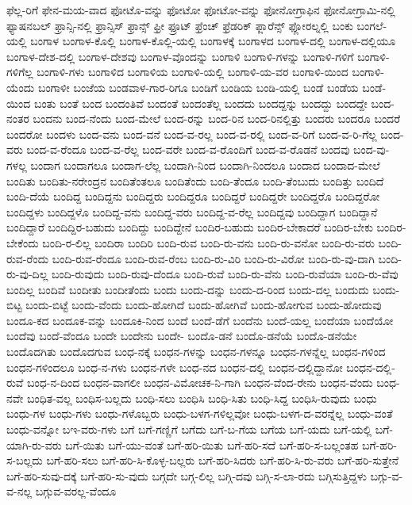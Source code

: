 {ಫೆಲ್ಲ-ರಿಗೆ
ಫೇನ-ಮಯ-ವಾದ
ಫೋಟೊ-ವನ್ನು
ಫೋಟೋ
ಫೋಟೋ-ವನ್ನು
ಫೋನೋಗ್ರಾಫಿನ
ಫೋನೋಗ್ರಾಮಿ-ನಲ್ಲಿ
ಫ್ಯಾಷನಬಲ್
ಫ್ರಾನ್ಸಿ-ನಲ್ಲಿ
ಫ್ರಾನ್ಸಿಸ್
ಫ್ರಾನ್ಸ್
ಫ್ರೀ
ಫ್ರೂಟ್
ಫ್ರೆಂಚ್
ಫ್ರೆಡರಿಕ್
ಫ್ಲಾರೆನ್ಸ್
ಫ್ಲೋರಲ್ನಲ್ಲಿ
ಬಂಕು
ಬಂಗಲೆ-ಯಲ್ಲಿ
ಬಂಗಾಳ
ಬಂಗಾಳ-ಕೊಲ್ಲಿ
ಬಂಗಾಳ-ಕೊಲ್ಲಿ-ಯಲ್ಲಿ
ಬಂಗಾಳಕ್ಕೆ
ಬಂಗಾಳದ
ಬಂಗಾಳ-ದಲ್ಲಿ
ಬಂಗಾಳ-ದಲ್ಲಿಯೂ
ಬಂಗಾಳ-ದೇಶ-ದಲ್ಲಿ
ಬಂಗಾಳ-ದೇಶವು
ಬಂಗಾಳ-ವೊಂದನ್ನು
ಬಂಗಾಳಿ
ಬಂಗಾಳಿ-ಗಳನ್ನು
ಬಂಗಾಳಿ-ಗಳಿಗೆ
ಬಂಗಾಳಿ-ಗಳಿಗೆಲ್ಲ
ಬಂಗಾಳಿ-ಗಳು
ಬಂಗಾಳಿದ
ಬಂಗಾಳಿಯ
ಬಂಗಾಳಿ-ಯಲ್ಲಿ
ಬಂಗಾಳಿ-ಯ-ವರ
ಬಂಗಾಳಿ-ಯಿಂದ
ಬಂಗಾಳಿ-ಯೆಂದು
ಬಂಗಾಳೀ
ಬಂಜೆಯ
ಬಂಡವಾಳ-ಗಾರ-ರಿಗೂ
ಬಂಡಿಗೆ
ಬಂಡಿಯ
ಬಂಡಿ-ಯಲ್ಲಿ
ಬಂಡೆ
ಬಂಡೆಯ
ಬಂಡೆ-ಯಿಂದ
ಬಂತು
ಬಂತೆ
ಬಂದ
ಬಂದಂತಿವೆ
ಬಂದಂತೆ
ಬಂದಂತೆಲ್ಲ
ಬಂದದು
ಬಂದದ್ದನ್ನು
ಬಂದದ್ದು
ಬಂದದ್ದೇ
ಬಂದ-ನಂತರ
ಬಂದನು
ಬಂದ-ನೆಂದು
ಬಂದ-ಮೇಲೆ
ಬಂದ-ರನ್ನು
ಬಂದ-ರಿನ
ಬಂದ-ರಿನಲ್ಲಿತ್ತು
ಬಂದರು
ಬಂದರೂ
ಬಂದರೆ
ಬಂದರೋ
ಬಂದಳು
ಬಂದ-ವನು
ಬಂದ-ವನೆ
ಬಂದ-ವ-ರಲ್ಲ
ಬಂದ-ವ-ರಲ್ಲಿ
ಬಂದ-ವ-ರಿಗೆ
ಬಂದ-ವ-ರಿ-ಗೆಲ್ಲ
ಬಂದ-ವರು
ಬಂದ-ವ-ರೆಂದೂ
ಬಂದ-ವ-ರೆಲ್ಲ
ಬಂದ-ವರೇ
ಬಂದ-ವ-ರೊಂದಿಗೆ
ಬಂದ-ವ-ರೊಡನೆ
ಬಂದವು
ಬಂದ-ವು-ಗಳಲ್ಲ
ಬಂದಾಗ
ಬಂದಾಗಲೂ
ಬಂದಾಗ-ಲೆಲ್ಲ
ಬಂದಾಗಿ-ನಿಂದ
ಬಂದಾಗಿ-ನಿಂದಲೂ
ಬಂದಾದ
ಬಂದಾದ-ಮೇಲೆ
ಬಂದಿತು
ಬಂದಿತು-ನರೇಂದ್ರನ
ಬಂದಿತೆಂತಲೂ
ಬಂದಿತೆಂದು
ಬಂದಿ-ತೆಂದೂ
ಬಂದಿ-ತೆಂಬುದು
ಬಂದಿತ್ತು
ಬಂದಿದೆ
ಬಂದಿ-ದೆಯೆ
ಬಂದಿದ್ದ
ಬಂದಿದ್ದನು
ಬಂದಿದ್ದರು
ಬಂದಿದ್ದರೂ
ಬಂದಿದ್ದರೆ
ಬಂದಿದ್ದರೇ
ಬಂದಿದ್ದರೊ
ಬಂದಿದ್ದರೋ
ಬಂದಿದ್ದಳು
ಬಂದಿದ್ದಳೊ
ಬಂದಿದ್ದ-ವನು
ಬಂದಿದ್ದ-ವರು
ಬಂದಿದ್ದ-ವ-ರೆಲ್ಲ
ಬಂದಿದ್ದವು
ಬಂದಿದ್ದಾಗ
ಬಂದಿದ್ದಾನೆ
ಬಂದಿದ್ದಾರೆ
ಬಂದಿದ್ದಿರ-ಬಹುದು
ಬಂದಿದ್ದು
ಬಂದಿದ್ದೇನೆ
ಬಂದಿರ-ಬಹುದು
ಬಂದಿರ-ಬೇಕಾದರೆ
ಬಂದಿರ-ಬೇಕು
ಬಂದಿರ-ಬೇಕೆಂದು
ಬಂದಿ-ರ-ಲಿಲ್ಲ
ಬಂದಿರಾ
ಬಂದಿರಿ
ಬಂದಿ-ರುವ
ಬಂದಿ-ರು-ವನು
ಬಂದಿ-ರು-ವನೋ
ಬಂದಿ-ರು-ವರು
ಬಂದಿ-ರುವ-ರೆಂದು
ಬಂದಿ-ರುವ-ರೆಂದೂ
ಬಂದಿ-ರುವ-ರೆಂಬ
ಬಂದಿ-ರು-ವಿರಿ
ಬಂದಿ-ರು-ವಿರೋ
ಬಂದಿ-ರು-ವು-ದಾಗಿ
ಬಂದಿ-ರು-ವು-ದಿಲ್ಲ
ಬಂದಿ-ರುವುದು
ಬಂದಿ-ರುವು-ದೆಂದೂ
ಬಂದಿ-ರುವೆ
ಬಂದಿ-ರು-ವೆನು
ಬಂದಿ-ರುವೆಯಾ
ಬಂದಿ-ರು-ವೆವು
ಬಂದಿಲ್ಲ
ಬಂದಿವೆ
ಬಂದೀತು
ಬಂದೀತೆಂದು
ಬಂದು
ಬಂದು-ದನ್ನು
ಬಂದು-ದ-ರಿಂದ
ಬಂದು-ದಲ್ಲ
ಬಂದುದು
ಬಂದು-ಬಿಟ್ಟ
ಬಂದು-ಬಿಟ್ಟೆ
ಬಂದು-ವೆಂದು
ಬಂದು-ಹೋಗಿದೆ
ಬಂದು-ಹೋಗಿವೆ
ಬಂದು-ಹೋಗುವ
ಬಂದು-ಹೋದುವು
ಬಂದೂ-ಕದ
ಬಂದೂಕ-ವನ್ನು
ಬಂದೂಕಿ-ನಿಂದ
ಬಂದೆ
ಬಂದೆ-ಡೆಗೆ
ಬಂದೆನು
ಬಂದೆ-ಯಲ್ಲ
ಬಂದೆಯಾ
ಬಂದೆಯೋ
ಬಂದೆವು
ಬಂದೆ-ವೆಂದೂ
ಬಂದೇ
ಬಂದೇನು
ಬಂದೇ-
ಬಂದೊ-ಡನೆ
ಬಂದೊ-ಡನೆಯೆ
ಬಂದೊ-ಡನೆಯೇ
ಬಂದೊದಗಿತು
ಬಂದೊದಗುವ
ಬಂಧ-ನಕ್ಕೆ
ಬಂಧನ-ಗಳನ್ನು
ಬಂಧನ-ಗಳನ್ನೂ
ಬಂಧನ-ಗಳನ್ನೆಲ್ಲ
ಬಂಧನ-ಗಳಿಂದ
ಬಂಧನ-ಗಳಿಂದಲೂ
ಬಂಧ-ನ-ಗಳು
ಬಂಧನ-ಗಳೇ
ಬಂಧ-ನದ
ಬಂಧನ-ದಲ್ಲಿ
ಬಂಧನ-ದಲ್ಲಿದ್ದಾನೋ
ಬಂಧನ-ದಲ್ಲಿ-ರುವೆ
ಬಂಧ-ನ-ದಿಂದ
ಬಂಧನ-ವಾಗಲೀ
ಬಂಧನ-ವಿಮೋಚಕ-ನಿ-ಗಾಗಿ
ಬಂಧನ-ವೆಂದ-ರೇನು
ಬಂಧನ-ವೆಂದು
ಬಂಧ-ನವೇ
ಬಂಧಿತ-ವಲ್ಲ
ಬಂಧಿಸ-ಬಲ್ಲದು
ಬಂಧಿ-ಸಲು
ಬಂಧಿಸಿ
ಬಂಧಿ-ಸಿತು
ಬಂಧಿ-ಸಿದ್ದ
ಬಂಧಿಸಿ-ರುವುದು
ಬಂಧು
ಬಂಧು-ಗಳ
ಬಂಧು-ಗಳು
ಬಂಧು-ಗಳೊಬ್ಬರು
ಬಂಧು-ಬಳಗ-ಗಳಿಲ್ಲವೋ
ಬಂಧು-ಬಳಗ-ದ-ವರನ್ನೆಲ್ಲ
ಬಂಧು-ವಂತೆ
ಬಂಧು-ವನ್ನೋ
ಬಇ-ವರು-ಗಳು
ಬಗೆ
ಬಗೆ-ಗಣ್ಣಿಗೆ
ಬಗೆದು
ಬಗೆ-ಬ-ಗೆಯ
ಬಗೆಯ
ಬಗೆ-ಯದು
ಬಗೆ-ಯಲ್ಲಿ
ಬಗೆ-ಯಾಗಿ-ರು-ವರು
ಬಗೆ-ಯಿತು
ಬಗೆ-ಯು-ವಂತೆ
ಬಗೆ-ಹರಿ-ಯಿತು
ಬಗೆ-ಹರಿ-ಸದೆ
ಬಗೆ-ಹರಿ-ಸ-ಬಲ್ಲಂತಹ
ಬಗೆ-ಹರಿ-ಸ-ಬಲ್ಲದು
ಬಗೆ-ಹರಿ-ಸಲು
ಬಗೆ-ಹರಿ-ಸಿ-ಕೊಳ್ಳ-ಬಲ್ಲರು
ಬಗೆ-ಹರಿ-ಸಿದರು
ಬಗೆ-ಹರಿ-ಸಿ-ರು-ವರು
ಬಗೆ-ಹರಿ-ಸುತ್ತೇನೆ
ಬಗೆ-ಹರಿ-ಸುವು-ದಕ್ಕೆ
ಬಗೆ-ಹರಿ-ಸು-ವುದು
ಬಗ್ಗದೇ
ಬಗ್ಗ-ಲಿಲ್ಲ
ಬಗ್ಗಿ-ದವು
ಬಗ್ಗಿ-ಸ-ಲಾ-ರದು
ಬಗ್ಗಿಸುತ್ತಿದ್ದಳು
ಬಗ್ಗು-ವ-ವ-ನಲ್ಲ
ಬಗ್ಗುವ-ವರಲ್ಲ-ವೆಂದೂ
}
